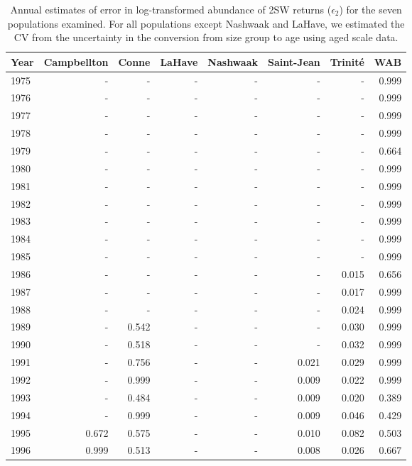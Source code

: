 \begingroup\footnotesize
\begin{longtable}{lrrrrrrr}
\caption{Annual estimates of error in log-transformed abundance of 2SW returns 
                    ($\epsilon_{2}$) for the seven populations
                    examined. For all populations except Nashwaak and LaHave, we estimated the CV 
                    from the uncertainty in the conversion from size group to age using aged scale data.} \\ 
  \hline
Year & Campbellton & Conne & LaHave & Nashwaak & Saint-Jean & Trinité & WAB \\ 
  \hline
1975 & - & - & - & - & - & - & 0.999 \\ 
  1976 & - & - & - & - & - & - & 0.999 \\ 
  1977 & - & - & - & - & - & - & 0.999 \\ 
  1978 & - & - & - & - & - & - & 0.999 \\ 
  1979 & - & - & - & - & - & - & 0.664 \\ 
  1980 & - & - & - & - & - & - & 0.999 \\ 
  1981 & - & - & - & - & - & - & 0.999 \\ 
  1982 & - & - & - & - & - & - & 0.999 \\ 
  1983 & - & - & - & - & - & - & 0.999 \\ 
  1984 & - & - & - & - & - & - & 0.999 \\ 
  1985 & - & - & - & - & - & - & 0.999 \\ 
  1986 & - & - & - & - & - & 0.015 & 0.656 \\ 
  1987 & - & - & - & - & - & 0.017 & 0.999 \\ 
  1988 & - & - & - & - & - & 0.024 & 0.999 \\ 
  1989 & - & 0.542 & - & - & - & 0.030 & 0.999 \\ 
  1990 & - & 0.518 & - & - & - & 0.032 & 0.999 \\ 
  1991 & - & 0.756 & - & - & 0.021 & 0.029 & 0.999 \\ 
  1992 & - & 0.999 & - & - & 0.009 & 0.022 & 0.999 \\ 
  1993 & - & 0.484 & - & - & 0.009 & 0.020 & 0.389 \\ 
  1994 & - & 0.999 & - & - & 0.009 & 0.046 & 0.429 \\ 
  1995 & 0.672 & 0.575 & - & - & 0.010 & 0.082 & 0.503 \\ 
  1996 & 0.999 & 0.513 & - & - & 0.008 & 0.026 & 0.667 \\ 

\end{longtable}
